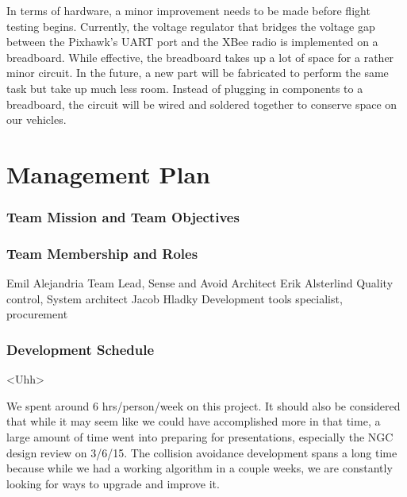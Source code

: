 \documentclass[12pt]{article}
\begin{document}
In terms of hardware, a minor improvement needs to be made before flight testing begins. Currently, the voltage regulator that bridges the voltage gap between the Pixhawk's UART port and the XBee radio is implemented on a breadboard. While effective, the breadboard takes up a lot of space for a rather minor circuit. In the future, a new part will be fabricated to perform the same task but take up much less room. Instead of plugging in components to a breadboard, the circuit will be wired and soldered together to conserve space on our vehicles.


\section{Management Plan}
\subsubsection{Team Mission and Team Objectives}

\subsubsection{Team Membership and Roles}
Emil Alejandria                 	Team Lead, Sense and Avoid Architect
Erik Alsterlind                   	Quality control, System architect
Jacob Hladky                    	Development tools specialist, procurement

\subsubsection{Development Schedule}

<Uhh>

	We spent around 6 hrs/person/week on this project. It should also be considered that while it may seem like we could have accomplished more in that time, a large amount of time went into preparing for presentations, especially the NGC design review on 3/6/15. The collision avoidance development spans a long time because while we had a working algorithm in a couple weeks, we are constantly looking for ways to upgrade and improve it.
\end{document}
